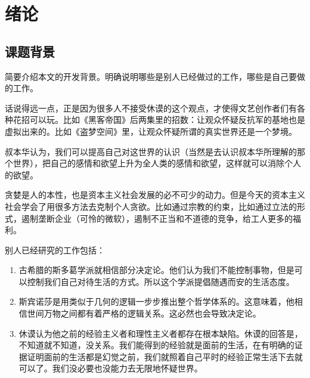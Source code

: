 
\clearpage
\setcounter{page}{1} 

\chapter{绪论}

\section{课题背景}
简要介绍本文的开发背景。明确说明哪些是别人已经做过的工作，哪些是自己要做的工作。


话说得远一点，正是因为很多人不接受休谟的这个观点，才使得文艺创作者们有各种花招可以玩。比如《黑客帝国》后两集里的招数：让观众怀疑反抗军的基地也是虚拟出来的。比如《盗梦空间》里，让观众怀疑所谓的真实世界还是一个梦境。

叔本华认为，我们可以提高自己对这世界的认识（当然是去认识叔本华所理解的那个世界），把自己的感情和欲望上升为全人类的感情和欲望，这样就可以消除个人的欲望\cite{chen2005laser}。

贪婪是人的本性，也是资本主义社会发展的必不可少的动力。但是今天的资本主义社会学会了用很多方法去克制个人贪欲。比如通过宗教的约束，比如通过立法的形式，遏制垄断企业（可怜的微软），遏制不正当和不道德的竞争，给工人更多的福利\cite{chen2005laser, mittelbach2004latex, zhen2018leave}。

别人已经研究的工作包括：
\begin{enumerate}
	\item 古希腊的斯多葛学派就相信部分决定论。他们认为我们不能控制事物，但是可以控制我们自己对待生活的方式。所以这个学派提倡随遇而安的生活态度\cite{zhou2002nerualnet}。
	\item 斯宾诺莎是用类似于几何的逻辑一步步推出整个哲学体系的。这意味着，他相信世间万物之间都有着严格的逻辑关系。这必然也会导致决定论\cite{qi2020deeplearning}。
	\item 休谟认为他之前的经验主义者和理性主义者都存在根本缺陷。休谟的回答是，不知道就不知道，没关系。我们能得到的经验就是面前的生活，在有明确的证据证明面前的生活都是幻觉之前，我们就照着自己平时的经验正常生活下去就可以了。我们没必要也没能力去无限地怀疑世界\cite{partl2019short}。
\end{enumerate}

